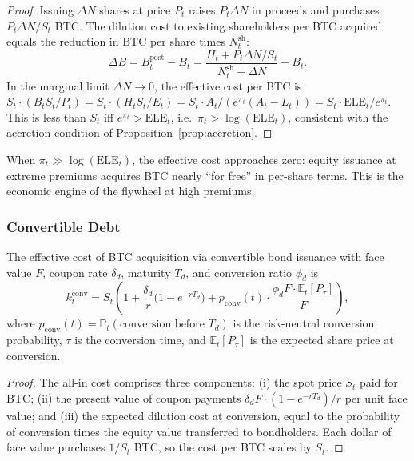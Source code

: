 \begin{proof}
Issuing $\Delta N$ shares at price $P_t$ raises $P_t \Delta N$ in proceeds
and purchases $P_t \Delta N / S_t$ BTC.  The dilution cost to existing
shareholders per BTC acquired equals the reduction in BTC per share times
$N_t^{\mathrm{sh}}$:
\[
  \Delta B = B_t^{\mathrm{post}} - B_t
  = \frac{H_t + P_t \Delta N / S_t}{N_t^{\mathrm{sh}} + \Delta N} - B_t.
\]
In the marginal limit $\Delta N \to 0$, the effective cost per BTC is
$S_t \cdot (B_t S_t / P_t) = S_t \cdot (H_t S_t / E_t)
= S_t \cdot A_t / (e^{\pi_t}(A_t - L_t))
= S_t \cdot \mathrm{ELE}_t / e^{\pi_t}$.
This is less than $S_t$ iff $e^{\pi_t} > \mathrm{ELE}_t$, i.e.\
$\pi_t > \log(\mathrm{ELE}_t)$, consistent with the accretion condition
of Proposition~\ref{prop:accretion}.
\end{proof}

\begin{remark}
When $\pi_t \gg \log(\mathrm{ELE}_t)$, the effective cost approaches zero:
equity issuance at extreme premiums acquires BTC nearly ``for free'' in
per-share terms.  This is the economic engine of the flywheel at high premiums.
\end{remark}

\subsubsection{Convertible Debt}

\begin{proposition}\label{prop:cost_conv}
The effective cost of BTC acquisition via convertible bond issuance with
face value $F$, coupon rate $\delta_d$, maturity $T_d$, and conversion ratio
$\phi_d$ is
\begin{equation}\label{eq:k_conv}
  k_t^{\mathrm{conv}}
  = S_t \left(1
    + \frac{\delta_d}{r} \bigl(1 - e^{-r T_d}\bigr)
    + p_{\mathrm{conv}}(t) \cdot \frac{\phi_d F \cdot \mathbb{E}_t[P_\tau]}{F}
    \right),
\end{equation}
where $p_{\mathrm{conv}}(t) = \mathbb{P}_t(\text{conversion before } T_d)$
is the risk-neutral conversion probability, $\tau$ is the conversion time,
and $\mathbb{E}_t[P_\tau]$ is the expected share price at conversion.
\end{proposition}

\begin{proof}
The all-in cost comprises three components: (i) the spot price $S_t$ paid
for BTC; (ii) the present value of coupon payments
$\delta_d F \cdot (1 - e^{-rT_d})/r$ per unit face value; and (iii) the
expected dilution cost at conversion, equal to the probability of
conversion times the equity value transferred to bondholders.  Each dollar
of face value purchases $1/S_t$ BTC, so the cost per BTC scales by $S_t$.
\end{proof}

